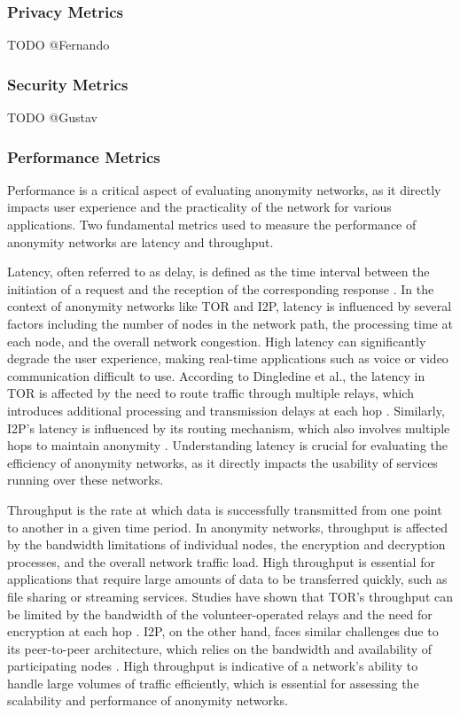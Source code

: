 \documentclass[12pt,conference]{IEEEtran}
\begin{document}
\subsubsection{Privacy Metrics}
TODO @Fernando %
\subsubsection{Security Metrics}
TODO @Gustav %
\subsubsection{Performance Metrics}
Performance is a critical aspect of evaluating anonymity networks, as it directly impacts user experience and the practicality of the network for various applications. Two fundamental metrics used to measure the performance of anonymity networks are latency and throughput.

Latency, often referred to as delay, is defined as the time interval between the initiation of a request and the reception of the corresponding response \cite{dataAndComputerCommunications}. In the context of anonymity networks like TOR and I2P, latency is influenced by several factors including the number of nodes in the network path, the processing time at each node, and the overall network congestion. High latency can significantly degrade the user experience, making real-time applications such as voice or video communication difficult to use. According to Dingledine et al., the latency in TOR is affected by the need to route traffic through multiple relays, which introduces additional processing and transmission delays at each hop \cite{TorTheSecondGenerationOnionRouter}. Similarly, I2P's latency is influenced by its routing mechanism, which also involves multiple hops to maintain anonymity \cite{i2p}. Understanding latency is crucial for evaluating the efficiency of anonymity networks, as it directly impacts the usability of services running over these networks.

Throughput is the rate at which data is successfully transmitted from one point to another in a given time period. In anonymity networks, throughput is affected by the bandwidth limitations of individual nodes, the encryption and decryption processes, and the overall network traffic load. High throughput is essential for applications that require large amounts of data to be transferred quickly, such as file sharing or streaming services. Studies have shown that TOR's throughput can be limited by the bandwidth of the volunteer-operated relays and the need for encryption at each hop \cite{TorTheSecondGenerationOnionRouter}. I2P, on the other hand, faces similar challenges due to its peer-to-peer architecture, which relies on the bandwidth and availability of participating nodes \cite{i2p}. High throughput is indicative of a network's ability to handle large volumes of traffic efficiently, which is essential for assessing the scalability and performance of anonymity networks.
\end{document}

